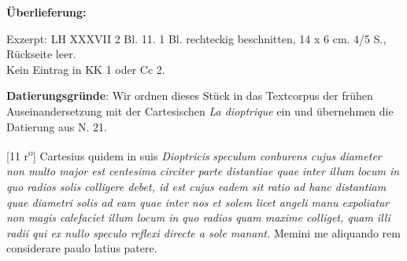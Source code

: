       
               
                \begin{ledgroupsized}[r]{120mm}
                \footnotesize 
                \pstart                
                \noindent\textbf{\"{U}berlieferung:}   
                \pend
                \end{ledgroupsized}
            
              
                            \begin{ledgroupsized}[r]{114mm}
                            \footnotesize 
                            \pstart \parindent -6mm
                            Exzerpt: LH XXXVII 2 Bl. 11. 1 Bl. rechteckig beschnitten, 14 x 6 cm. 4/5 S., R\"{u}ckseite leer.\\Kein Eintrag in KK 1 oder Cc 2. \pend
                            \end{ledgroupsized}
                \vspace*{5mm}
                \begin{ledgroup}
                \footnotesize 
                \pstart
            \noindent\footnotesize{\textbf{Datierungsgr\"{u}nde}: Wir ordnen dieses St\"{u}ck in das Textcorpus der fr\"{u}hen Auseinandersetzung mit der Cartesischen \cite{00038}\textit{La dioptrique} ein und \"{u}bernehmen die Datierung aus N. 21.}
                \pend
                \end{ledgroup}
            
                \vspace*{8mm}
                \pstart 
                \normalsize
            [11 r\textsuperscript{o}] Cartesius\protect{} quidem in suis \textit{Dioptricis}  \textit{speculum conburens cujus diameter non multo major est centesima circiter parte distantiae quae }\textit{ inter illum locum in quo radios solis colligere debet, id est cujus eadem sit ratio ad hanc distantiam quae diametri solis ad eam quae inter nos et solem licet angeli manu expoliatur non magis calefaciet illum locum in quo radios quam maxime colliget, quam illi radii qui ex nullo speculo reflexi directe a sole manant.} Memini me aliquando rem considerare  paulo latius patere.\pend 